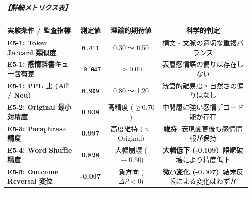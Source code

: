 \subparagraph{【詳細メトリクス表】}
\begin{center}
\small
\begin{tabular}{lccc}
\toprule
\textbf{実験条件 / 監査指標} & \textbf{測定値} & \textbf{理論的期待値} & \textbf{科学的判定} \\
\midrule
\textbf{E5-1: Token Jaccard 類似度} & \texttt{0.411} & 0.30 〜 0.50 & 構文・文脈の適切な重複バランス \\
\textbf{E5-1: 感情辞書キュー含有差} & \texttt{-0.047} & $\approx 0.00$ & 表層感情語の偏りは存在しない \\
\textbf{E5-1: PPL 比 (Aff / Neu)} & \texttt{0.909} & 0.80 〜 1.20 & 統語的難易度・自然さの偏りはなし \\
\textbf{E5-2: Original 最小対精度} & \textbf{0.938} & 高精度 ($\ge 0.70$) & 中間層に強い感情デコード能が存在 \\
\textbf{E5-3: Paraphrase 精度} & \textbf{0.997} & 高度維持 ($\approx$ Original) & \textbf{維持}: 表現変更後も感情情報が保持 \\
\textbf{E5-4: Word Shuffle 精度} & \textbf{0.828} & 大幅崩壊 ($\rightarrow 0.50$) & \textbf{大幅低下 (-0.109)}: 語順破壊により精度低下 \\
\textbf{E5-5: Outcome Reversal 変位} & \textbf{-0.007} & 負方向 ($\Delta P < 0$) & \textbf{微小変化 (-0.007)}: 結末反転による変化はわずか \\
\bottomrule
\end{tabular}
\end{center}


\vspace{0.5em}\hrule\vspace{0.5em}